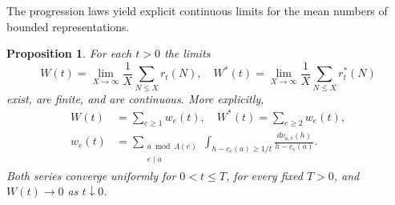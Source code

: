 \documentclass[11pt,letterpaper,reqno]{amsart}
\numberwithin{equation}{section}
\newtheorem{proposition}[theorem]{Proposition}
\theoremstyle{remark}
\newcommand{\1}{\mathbf 1}
\renewcommand{\leq}{\leqslant}
\renewcommand{\geq}{\geqslant}
\begin{document}
The progression laws yield explicit continuous limits for the mean numbers of bounded representations.

\begin{proposition}
\label{prop:dadd:witness-means}
For each $t>0$ the limits
\[
 W(t)=\lim_{X\to\infty}\frac1X\sum_{N\leq X}r_t(N),
 \quad
 W^*(t)=\lim_{X\to\infty}\frac1X\sum_{N\leq X}r_t^*(N)
\]
exist, are finite, and are continuous. More explicitly,
\begin{align*}
 W(t)&=\sum_{e\geq1}w_e(t),\quad
 W^*(t)=\sum_{e\geq2}w_e(t), \\
 w_e(t)
 &=\sum_{\substack{a\bmod \Lambda(e)\\e\mid a}}
 \int_{h-c_e(a)\geq1/t}
 \frac{d\nu_{a,e}(h)}{h-c_e(a)}.
\end{align*}
Both series converge uniformly for $0<t\leq T$, for every fixed
$T>0$, and $W(t)\to0$ as $t\downarrow0$.
\end{proposition}
\end{document}
